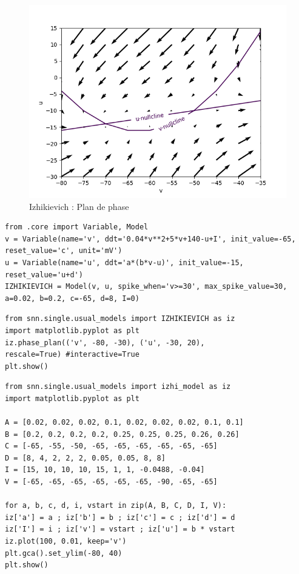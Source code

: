\documentclass[12pt]{scrartcl}
\begin{document}
\begin{figure}[!h]
\centering
\includegraphics[scale=0.8]{imgs/izPDP.png}
\caption{ Izhikievich : Plan de phase}
\label{izPDP}
\end{figure}
\clearpage
\begin{lstlisting}[caption = {Izhikievich : Définition du modèle}]
from .core import Variable, Model
v = Variable(name='v', ddt='0.04*v**2+5*v+140-u+I', init_value=-65, 
reset_value='c', unit='mV')
u = Variable(name='u', ddt='a*(b*v-u)', init_value=-15,
reset_value='u+d')
IZHIKIEVICH = Model(v, u, spike_when='v>=30', max_spike_value=30, 
a=0.02, b=0.2, c=-65, d=8, I=0) 
\end{lstlisting}

\begin{lstlisting}[caption = {Izhikievich : Plan de phase}]
from snn.single.usual_models import IZHIKIEVICH as iz
import matplotlib.pyplot as plt
iz.phase_plan(('v', -80, -30), ('u', -30, 20), 
rescale=True) #interactive=True
plt.show()
\end{lstlisting}

\begin{lstlisting}[caption = {Izhikievich : Evolution du potentiel de membrane en fonction du temps pour plusieurs ensembles de paramètres}]
from snn.single.usual_models import izhi_model as iz
import matplotlib.pyplot as plt

A = [0.02, 0.02, 0.02, 0.1, 0.02, 0.02, 0.02, 0.1, 0.1]
B = [0.2, 0.2, 0.2, 0.2, 0.25, 0.25, 0.25, 0.26, 0.26]
C = [-65, -55, -50, -65, -65, -65, -65, -65, -65]
D = [8, 4, 2, 2, 2, 0.05, 0.05, 8, 8]
I = [15, 10, 10, 10, 15, 1, 1, -0.0488, -0.04]
V = [-65, -65, -65, -65, -65, -65, -90, -65, -65]

for a, b, c, d, i, vstart in zip(A, B, C, D, I, V):
iz['a'] = a ; iz['b'] = b ; iz['c'] = c ; iz['d'] = d
iz['I'] = i ; iz['v'] = vstart ; iz['u'] = b * vstart
iz.plot(100, 0.01, keep='v')
plt.gca().set_ylim(-80, 40)
plt.show()
\end{lstlisting}
\end{document}

